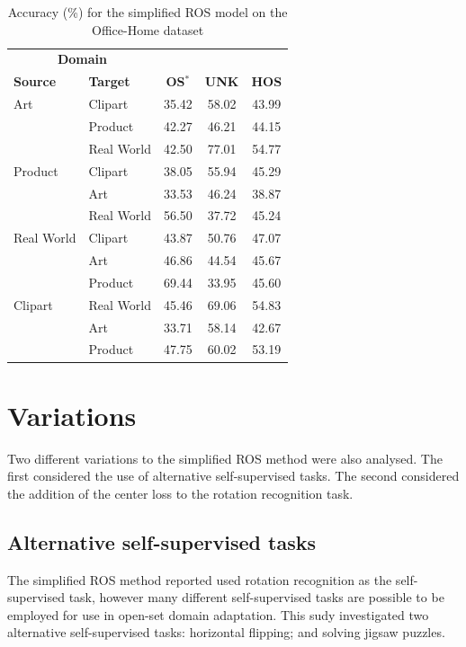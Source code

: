 \documentclass[10pt,twocolumn,letterpaper]{article}
\begin{document}
\begin{table}[!htb]
  \centering
  \begin{tabular}{@{}|ll|ccc|@{}}
    \hline
\multicolumn{2}{|c}{\textbf{Domain}} & & & \\
\textbf{Source} & \textbf{Target} & \textbf{OS$^*$} & \textbf{UNK} & \textbf{HOS} \\ \hline
Art & Clipart & 35.42 & 58.02 & 43.99 \\
& Product & 42.27 & 46.21 & 44.15 \\
 & Real World & 42.50 & 77.01 & 54.77 \\ \hline
Product & Clipart & 38.05 & 55.94 & 45.29 \\
& Art & 33.53 & 46.24 & 38.87 \\
& Real World & 56.50 & 37.72 & 45.24 \\ \hline
Real World & Clipart &43.87 & 50.76 & 47.07 \\
 & Art & 46.86 & 44.54 & 45.67\\
 & Product & 69.44 & 33.95 & 45.60 \\ \hline
Clipart & Real World & 45.46 & 69.06 & 54.83\\
 & Art & 33.71 & 58.14 & 42.67 \\
& Product & 47.75 & 60.02 & 53.19 \\
    \hline
  \end{tabular}
  \caption{Accuracy (\%) for the simplified ROS model on the Office-Home dataset}
  \label{tab:results}
\end{table}


\section{Variations}
\label{sec:variations}

Two different variations to the simplified ROS method were also analysed. The first considered the use of alternative self-supervised tasks. The second considered the addition of the center loss to the rotation recognition task.

\subsection{Alternative self-supervised tasks}

The simplified ROS method reported used rotation recognition as the self-supervised task, however many different self-supervised tasks are possible to be employed for use in open-set domain adaptation. This sudy investigated two alternative self-supervised tasks: horizontal flipping; and solving jigsaw puzzles.
\end{document}
